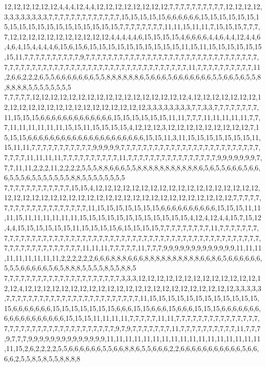12,12,12,12,12,12,4,4,4,12,4,4,12,12,12,12,12,12,12,12,7,7,7,7,7,7,7,7,7,7,12,12,12,12,3,3,3,3,3,3,3,3,7,7,7,7,7,7,7,7,7,7,7,7,7,15,15,15,15,15,6,6,6,6,6,6,15,15,15,15,15,15,15,15,15,15,15,15,15,15,15,15,15,15,15,7,7,7,7,7,7,7,7,11,11,15,11,11,7,15,15,15,7,7,7,7,12,12,12,12,12,12,12,12,12,12,12,4,4,4,4,4,6,15,15,15,15,4,6,6,6,6,4,4,6,4,4,12,4,4,6,4,6,4,15,4,4,4,4,6,15,6,15,6,15,15,15,15,15,15,15,15,15,15,11,15,11,15,15,15,15,15,15,15,11,7,7,7,7,7,7,7,7,7,7,9,7,7,7,7,7,7,7,7,7,7,7,7,7,7,7,7,7,7,7,7,7,7,7,7,7,7,7,7,7,7,7,7,7,7,7,7,7,7,7,7,7,7,7,7,7,7,7,7,7,7,7,7,7,7,7,7,7,7,7,7,7,7,7,7,11,7,7,7,7,7,7,7,7,7,7,11,2,6,6,2,2,2,6,5,5,6,6,6,6,6,6,6,5,5,8,8,8,8,8,8,6,5,6,6,6,5,6,6,6,6,6,6,6,5,5,6,6,5,6,5,5,8,8,8,8,8,5,5,5,5,5,5,5,5
7,7,7,7,7,12,12,12,12,12,12,12,12,12,12,12,12,12,12,12,12,12,4,12,12,12,12,12,12,12,12,12,12,12,12,12,12,12,12,12,12,12,12,12,12,12,3,3,3,3,3,3,3,3,7,7,3,3,7,7,7,7,7,7,7,7,11,15,15,15,6,6,6,6,6,6,6,6,6,6,6,6,6,15,15,15,15,15,15,11,11,7,7,7,11,11,11,11,11,7,7,7,11,11,11,11,11,11,15,15,11,15,15,15,15,4,12,12,12,3,12,12,12,12,12,12,12,12,12,7,15,15,15,6,6,6,6,6,6,6,6,6,6,6,6,6,6,6,6,6,6,6,6,6,15,15,11,3,11,15,15,15,15,15,15,15,11,15,11,11,7,7,7,7,7,7,7,7,7,7,7,9,9,9,9,9,7,7,7,7,7,7,7,7,7,7,7,7,7,7,7,7,7,7,7,7,7,7,7,7,7,7,7,7,7,11,11,11,11,7,7,7,7,7,7,7,7,7,7,11,7,7,7,7,7,7,7,7,7,7,7,7,7,7,7,7,9,9,9,9,9,9,9,7,7,7,11,11,2,2,2,11,2,2,2,2,5,5,5,8,8,6,6,6,5,5,8,8,8,8,8,8,8,8,8,8,8,6,5,6,5,5,6,6,6,5,6,6,6,5,5,5,6,5,5,5,5,5,5,5,8,8,5,5,5,5,5,5,5,5
7,7,7,7,7,7,7,7,7,7,7,7,15,15,4,12,12,12,12,12,12,12,12,12,12,12,12,12,12,12,12,12,12,12,12,12,12,12,12,12,12,12,12,12,12,12,12,12,12,12,12,12,12,12,12,12,12,12,7,7,7,7,7,7,7,7,7,7,7,7,7,7,7,7,7,7,7,7,11,15,15,15,15,15,15,15,6,6,6,6,6,6,6,6,6,6,15,15,15,11,11,11,15,11,11,11,11,11,11,15,15,15,15,15,15,15,15,15,15,15,15,4,12,4,12,4,4,15,7,15,12,4,4,15,15,15,15,15,15,11,15,15,15,15,6,15,15,15,15,7,7,7,7,7,7,7,7,7,11,7,7,7,7,7,7,7,7,7,7,7,7,7,7,7,7,7,7,7,7,7,7,7,7,7,7,7,7,7,7,7,7,7,7,7,7,7,7,7,7,7,7,7,7,7,7,7,7,7,7,7,7,7,7,7,7,7,7,7,7,7,7,7,7,7,7,7,11,11,11,7,7,7,7,7,11,7,7,7,9,9,9,9,9,9,9,9,9,9,9,9,9,11,11,11,11,11,11,11,11,11,2,2,2,2,2,2,6,6,6,8,8,8,6,6,6,8,8,8,8,8,8,8,8,8,8,6,6,8,6,5,6,6,6,6,6,6,5,5,5,6,6,6,6,6,5,6,5,8,8,8,5,5,5,5,8,5,5,8,8,5
7,7,7,7,7,7,7,7,7,7,7,7,7,7,7,7,7,7,7,7,7,3,3,3,12,12,12,12,12,12,12,12,12,12,12,12,12,12,12,4,12,12,12,12,12,12,12,12,12,12,12,12,12,12,12,12,12,12,12,12,12,12,12,3,3,3,3,3,7,7,7,7,7,7,7,7,7,7,7,7,7,7,7,7,7,7,7,7,7,7,7,7,11,15,15,15,15,15,15,15,15,15,15,15,15,15,6,6,6,6,6,6,6,15,15,15,15,15,15,15,6,6,6,15,15,6,6,6,15,6,6,6,15,15,15,6,6,6,6,6,6,6,6,6,6,6,6,6,6,6,6,6,6,15,15,15,11,11,11,11,7,7,7,7,7,11,11,7,7,7,7,7,7,7,7,7,7,7,7,7,7,7,7,7,7,7,7,7,7,7,7,7,7,7,7,7,7,7,7,7,7,7,9,7,9,7,7,7,7,7,7,7,11,7,7,7,7,7,7,7,7,7,7,11,7,7,7,9,7,7,7,9,9,9,9,9,9,9,9,9,9,9,9,9,9,11,11,11,11,11,11,11,11,11,11,11,11,11,11,11,11,11,11,15,2,6,2,2,2,2,5,5,6,6,6,6,6,6,5,5,6,6,8,8,6,5,5,6,6,6,2,2,6,6,6,6,6,6,6,6,6,6,6,5,6,6,6,6,2,5,5,8,5,8,5,5,8,8,8,8
